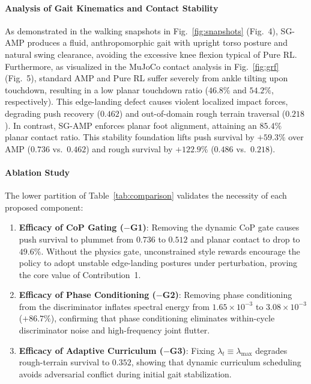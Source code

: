 \documentclass[conference]{IEEEtran}
\begin{document}
\paragraph{Analysis of Gait Kinematics and Contact Stability}
As demonstrated in the walking snapshots in Fig.~\ref{fig:snapshots} (Fig.~4), SG-AMP produces a fluid, anthropomorphic gait with upright torso posture and natural swing clearance, avoiding the excessive knee flexion typical of Pure RL. Furthermore, as visualized in the MuJoCo contact analysis in Fig.~\ref{fig:grf} (Fig.~5), standard AMP and Pure RL suffer severely from ankle tilting upon touchdown, resulting in a low planar touchdown ratio ($46.8\%$ and $54.2\%$, respectively). This edge-landing defect causes violent localized impact forces, degrading push recovery ($0.462$) and out-of-domain rough terrain traversal ($0.218$). In contrast, SG-AMP enforces planar foot alignment, attaining an $85.4\%$ planar contact ratio. This stability foundation lifts push survival by $+59.3\%$ over AMP ($0.736$ vs.\ $0.462$) and rough survival by $+122.9\%$ ($0.486$ vs.\ $0.218$).

\paragraph{Ablation Study}
The lower partition of Table~\ref{tab:comparison} validates the necessity of each proposed component:
\begin{enumerate}
    \item \textbf{Efficacy of CoP Gating ($-$G1)}: Removing the dynamic CoP gate causes push survival to plummet from $0.736$ to $0.512$ and planar contact to drop to $49.6\%$. Without the physics gate, unconstrained style rewards encourage the policy to adopt unstable edge-landing postures under perturbation, proving the core value of Contribution~1.
    \item \textbf{Efficacy of Phase Conditioning ($-$G2)}: Removing phase conditioning from the discriminator inflates spectral energy from $1.65\times 10^{-3}$ to $3.08\times 10^{-3}$ ($+86.7\%$), confirming that phase conditioning eliminates within-cycle discriminator noise and high-frequency joint flutter.
    \item \textbf{Efficacy of Adaptive Curriculum ($-$G3)}: Fixing $\lambda_t \equiv \lambda_{\max}$ degrades rough-terrain survival to $0.352$, showing that dynamic curriculum scheduling avoids adversarial conflict during initial gait stabilization.
\end{enumerate}
\end{document}
